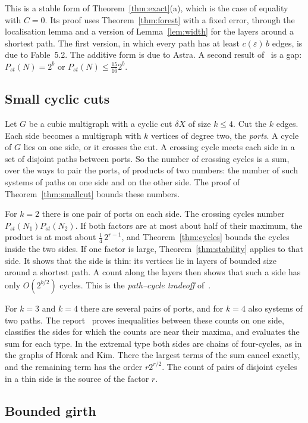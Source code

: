 This is a stable form of Theorem~\ref{thm:exact}(a), which is the case of equality with
$C=0$. Its proof uses Theorem~\ref{thm:forest} with a fixed error, through the localisation lemma
and a version of Lemma~\ref{lem:width} for the layers around a shortest path. The first version, in
which every path has at least $c(\varepsilon)\,b$ edges, is due to Fable~5.2. The additive form is
due to Astra. A second result of~\cite{S1} is a gap: $P_{st}(N)=2^{b}$ or
$P_{st}(N)\le\frac{15}{16}2^{b}$.

\subsection{Small cyclic cuts}

Let $G$ be a cubic multigraph with a cyclic cut $\delta X$ of size $k\le4$. Cut the $k$ edges. Each
side becomes a multigraph with $k$ vertices of degree two, the \emph{ports}. A cycle of $G$ lies
on one side, or it crosses the cut. A crossing cycle meets each side in a set of disjoint paths
between ports. So the number of crossing cycles is a sum, over the ways to pair the ports, of
products of two numbers: the number of such systems of paths on one side and on the other side.
The proof of Theorem~\ref{thm:smallcut} bounds these numbers.

For $k=2$ there is one pair of ports on each side. The crossing cycles number
$P_{st}(N_1)P_{st}(N_2)$. If both factors are at most about half of their maximum, the product is
at most about $\frac14\,2^{r-1}$, and Theorem~\ref{thm:cycles} bounds the cycles inside the two
sides. If one factor is large, Theorem~\ref{thm:stability} applies to that side. It shows that the
side is thin: its vertices lie in layers of bounded size around a shortest path. A count along the
layers then shows that such a side has only $O(2^{b/2})$ cycles. This is the
\emph{path--cycle tradeoff} of~\cite{S1}.

For $k=3$ and $k=4$ there are several pairs of ports, and for $k=4$ also systems of two paths. The
report~\cite{S1} proves inequalities between these counts on one side, classifies the sides for
which the counts are near their maxima, and evaluates the sum for each type. In the extremal type
both sides are chains of four-cycles, as in the graphs of Horak and Kim. There the largest terms of
the sum cancel exactly, and the remaining term has the order $r2^{r/2}$. The count of pairs of
disjoint cycles in a thin side is the source of the factor $r$.

\subsection{Bounded girth}


